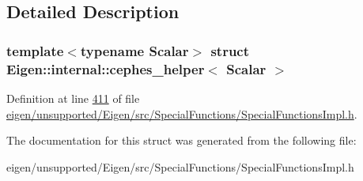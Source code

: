 \subsection{Detailed Description}
\subsubsection*{template$<$typename Scalar$>$\newline
struct Eigen\+::internal\+::cephes\+\_\+helper$<$ Scalar $>$}



Definition at line \hyperlink{eigen_2unsupported_2_eigen_2src_2_special_functions_2_special_functions_impl_8h_source_l00411}{411} of file \hyperlink{eigen_2unsupported_2_eigen_2src_2_special_functions_2_special_functions_impl_8h_source}{eigen/unsupported/\+Eigen/src/\+Special\+Functions/\+Special\+Functions\+Impl.\+h}.



The documentation for this struct was generated from the following file\+:\begin{DoxyCompactItemize}
\item 
eigen/unsupported/\+Eigen/src/\+Special\+Functions/\+Special\+Functions\+Impl.\+h\end{DoxyCompactItemize}
